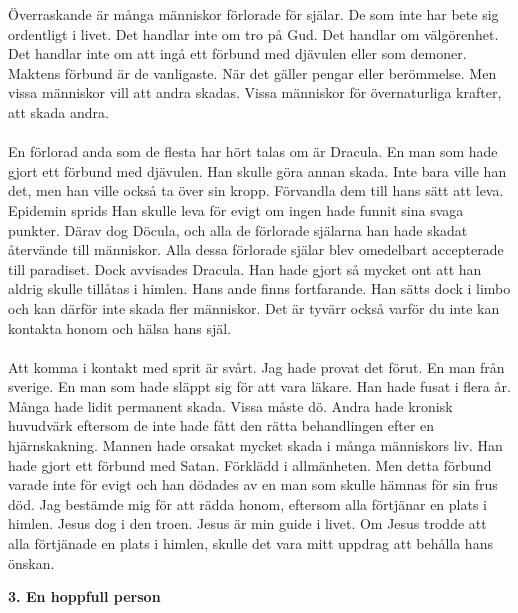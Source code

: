 \documentclass[]{article}
\begin{document}
Överraskande är många människor förlorade för själar. De som inte har bete sig ordentligt i livet. Det handlar inte om tro på Gud. Det handlar om välgörenhet. Det handlar inte om att ingå ett förbund med djävulen eller som demoner. Maktens förbund är de vanligaste. När det gäller pengar eller berömmelse. Men vissa människor vill att andra skadas. Vissa människor för övernaturliga krafter, att skada andra.
\\ \\
En förlorad anda som de flesta har hört talas om är Dracula. En man som hade gjort ett förbund med djävulen. Han skulle göra annan skada. Inte bara ville han det, men han ville också ta över sin kropp. Förvandla dem till hans sätt att leva. Epidemin sprids Han skulle leva för evigt om ingen hade funnit sina svaga punkter. Därav dog Döcula, och alla de förlorade själarna han hade skadat återvände till människor. Alla dessa förlorade själar blev omedelbart accepterade till paradiset. Dock avvisades Dracula. Han hade gjort så mycket ont att han aldrig skulle tillåtas i himlen. Hans ande finns fortfarande. Han sätts dock i limbo och kan därför inte skada fler människor. Det är tyvärr också varför du inte kan kontakta honom och hälsa hans själ.
\\ \\
Att komma i kontakt med sprit är svårt. Jag hade provat det förut. En man från sverige. En man som hade släppt sig för att vara läkare. Han hade fusat i flera år. Många hade lidit permanent skada. Vissa måste dö. Andra hade kronisk huvudvärk eftersom de inte hade fått den rätta behandlingen efter en hjärnskakning. Mannen hade orsakat mycket skada i många människors liv. Han hade gjort ett förbund med Satan. Förklädd i allmänheten. Men detta förbund varade inte för evigt och han dödades av en man som skulle hämnas för sin frus död. Jag bestämde mig för att rädda honom, eftersom alla förtjänar en plats i himlen. Jesus dog i den troen. Jesus är min guide i livet. Om Jesus trodde att alla förtjänade en plats i himlen, skulle det vara mitt uppdrag att behålla hans önskan.

\begin{center}
	\large\textbf{3. En hoppfull person}
\end{center}
\end{document}
